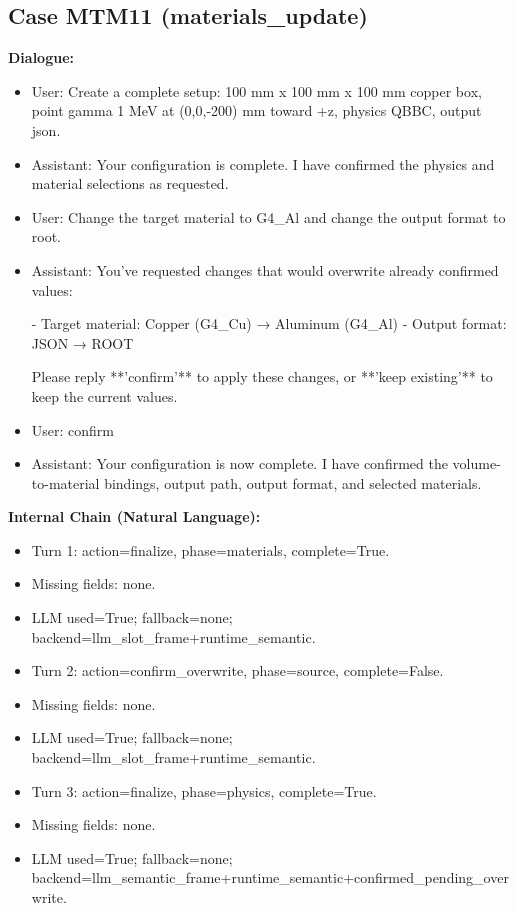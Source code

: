 \documentclass[11pt]{ctexart}
\begin{document}
\subsection{Case MTM11 (materials\_update)}
\textbf{Dialogue:}
\begin{itemize}
\item User: Create a complete setup: 100 mm x 100 mm x 100 mm copper box, point gamma 1 MeV at (0,0,-200) mm toward +z, physics QBBC, output json.
\item Assistant: Your configuration is complete. I have confirmed the physics and material selections as requested.
\item User: Change the target material to G4\_Al and change the output format to root.
\item Assistant: You've requested changes that would overwrite already confirmed values:

- Target material: Copper (G4\_Cu) → Aluminum (G4\_Al)
- Output format: JSON → ROOT

Please reply **'confirm'** to apply these changes, or **'keep existing'** to keep the current values.
\item User: confirm
\item Assistant: Your configuration is now complete. I have confirmed the volume-to-material bindings, output path, output format, and selected materials.
\end{itemize}
\textbf{Internal Chain (Natural Language):}
\begin{itemize}
\item Turn 1: action=finalize, phase=materials, complete=True.
\item Missing fields: none.
\item LLM used=True; fallback=none; backend=llm\_slot\_frame+runtime\_semantic.
\item Turn 2: action=confirm\_overwrite, phase=source, complete=False.
\item Missing fields: none.
\item LLM used=True; fallback=none; backend=llm\_slot\_frame+runtime\_semantic.
\item Turn 3: action=finalize, phase=physics, complete=True.
\item Missing fields: none.
\item LLM used=True; fallback=none; backend=llm\_semantic\_frame+runtime\_semantic+confirmed\_pending\_overwrite.
\end{itemize}
\end{document}

